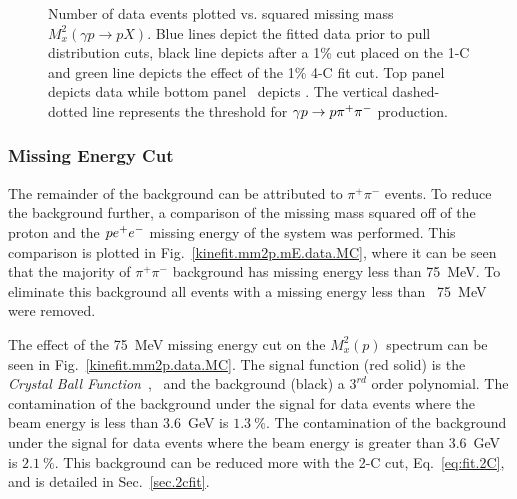 \begin{figure}[h!]\begin{center}

\caption[Number of data events plotted vs. missing mass $M_x(\gamma p \to p X)$]{\label{kinefit.Mass.Data.MC}Number of data events plotted vs. squared missing mass $M^{2}_x(\gamma p \to p X)$. Blue lines depict the fitted data prior to pull distribution cuts, black line depicts after a 1\% cut placed on the 1-C and green line depicts the effect of the 1\% 4-C fit cut. Top panel~ depicts data while bottom panel~ depicts . The vertical dashed-dotted line represents the threshold for $\gamma p \to p \pi^+\pi^-$ production.}

\end{center}\end{figure}
\FloatBarrier
\subsubsection{Missing Energy  Cut}
The remainder of the background can be attributed to $\pi^+\pi^-$ events. To reduce the background further, a comparison of the missing mass squared off of the proton and the $p e^+e^-$ missing energy of the system was performed. This comparison is plotted in Fig.~\ref{kinefit.mm2p.mE.data.MC}, where it can be seen that the majority of $\pi^+\pi^-$ background has missing energy less than 75~MeV. To eliminate this background all events with a missing energy less than ~75~MeV were removed.

The effect of the 75~MeV missing energy cut on the $M_x^2(p)$ spectrum can be seen in Fig.~\ref{kinefit.mm2p.data.MC}. The signal function (red solid) is the \emph{Crystal Ball Function}~\cite{CBwiki},~\cite{CBjlab} and the background (black) a $3^{rd}$ order polynomial. The contamination of the background under the \pizT signal for data events where the beam energy is less than 3.6~GeV is $1.3~\%$. The contamination of the background under the \pizT signal for data events where the beam energy is greater than 3.6~GeV is $2.1~\%$. This background can be reduced more with the 2-C cut, Eq.~\ref{eq:fit.2C}, and is detailed in Sec.~\ref{sec.2cfit}. 

